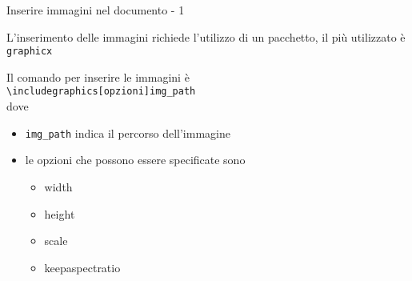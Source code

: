 \begin{frame}{Inserire immagini nel documento - 1}
	
L'inserimento delle immagini richiede l'utilizzo di un pacchetto, il più
utilizzato è \texttt{graphicx}

\vfill

Il comando per inserire le immagini è \\
\texttt{\textbackslash{}includegraphics[opzioni]{img\_path}} \\
dove

\begin{itemize}
	\item \texttt{img\_path} indica il percorso dell'immagine
	\item le opzioni che possono essere specificate sono
	\begin{itemize}
		\item width
		\item height
		\item scale
		\item keepaspectratio
	\end{itemize}
\end{itemize}

\end{frame}